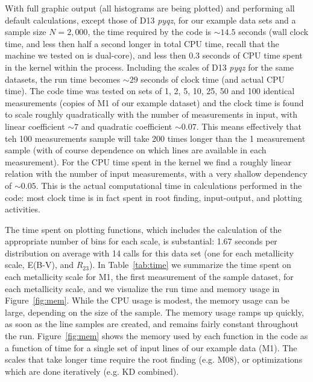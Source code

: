 \documentclass{emulateapj}
\begin{document}
With full graphic output (all histograms are being plotted) and performing all default calculations, except those of D13 \emph{pyqz}, for our example data sets and a sample size $N=2,000$, the time required by the code is $\sim14.5$ seconds (wall clock time, and less then half a second longer in total CPU time, recall that the machine we tested on is dual-core), and less then 0.3 seconds of CPU time spent in the kernel within the process. Including  the scales of D13 \emph{pyqz} for the same datasets, the run time becomes $\sim29$ seconds of clock time (and actual CPU time). 
The code time was tested on sets of 1, 2, 5, 10, 25, 50 and 100 identical measurements (copies of M1 of our example dataset) and the clock time is found to scale roughly quadratically with the number of measurements in input, with linear coefficient $\sim7$ and quadratic coefficient $\sim0.07$. This means effectively that teh 100 measurements sample will take 200 times longer than the 1 measurement sample (with of course dependence on which lines are available in each measurement). For the CPU time spent in the kernel we find a roughly linear relation with the number of input measurements, with a very shallow dependency of $\sim 0.05$. This is the actual computational time in calculations performed in the code: most clock time is in fact spent in root finding, input-output, and plotting activities.


The time spent on plotting functions, which includes the calculation of the appropriate number of bins for each scale, is substantial: 1.67 seconds per distribution on average with 14 calls for this data set (one for each metallicity scale, E(B-V), and $R_{23}$). In Table~\ref{tab:time}  we summarize the time spent on each metallicity scale for M1, the first measurement of the sample dataset, for each metallicity scale, and we visualize the run time and memory usage in Figure~\ref{fig:mem}. While the CPU usage is modest, the memory usage can be large, depending on the size of the sample.  The memory usage ramps up quickly, as soon as the line samples are created, 
and remains fairly constant throughout the run.  Figure~\ref{fig:mem} shows the memory used by each function in the code as a function of time for a single set of input lines of our example data (M1). The scales that take longer time require the root finding (e.g. M08), or optimizations which are done iteratively (e.g. KD combined).
\end{document}
